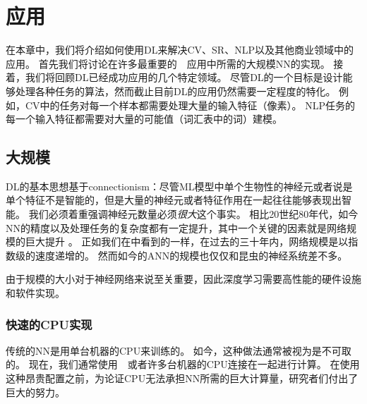 \chapter{应用}
\label{chap:applications}

在本章中，我们将介绍如何使用\gls{DL}来解决\gls{CV}、\gls{SR}、\gls{NLP}以及其他商业领域中的应用。
首先我们将讨论在许多最重要的~~应用中所需的大规模\gls{NN}的实现。
接着，我们将回顾\gls{DL}已经成功应用的几个特定领域。
尽管\gls{DL}的一个目标是设计能够处理各种任务的算法，然而截止目前\gls{DL}的应用仍然需要一定程度的特化。
例如，\gls{CV}中的任务对每一个样本都需要处理大量的输入特征（像素）。
\gls{NLP}任务的每一个输入特征都需要对大量的可能值（词汇表中的词）建模。

\section{大规模}
\label{sec:large_scale_deep_learning}

\gls{DL}的基本思想基于\gls{connectionism}：尽管\gls{ML}模型中单个生物性的神经元或者说是单个特征不是智能的，但是大量的神经元或者特征作用在一起往往能够表现出智能。
我们必须着重强调神经元数量必须\emph{很大}这个事实。
相比20世纪80年代，如今\gls{NN}的精度以及处理任务的复杂度都有一定提升，其中一个关键的因素就是网络规模的巨大提升
。
正如我们在中看到的一样，在过去的三十年内，网络规模是以指数级的速度递增的。
然而如今的\gls{ANN}的规模也仅仅和昆虫的神经系统差不多。

由于规模的大小对于神经网络来说至关重要，因此深度学习需要高性能的硬件设施和软件实现。

\subsection{快速的CPU实现}
\label{sec:fast_cpu_implementations}

传统的\gls{NN}是用单台机器的CPU来训练的。
如今，这种做法通常被视为是不可取的。
现在，我们通常使用~~或者许多台机器的CPU连接在一起进行计算。
在使用这种昂贵配置之前，为论证CPU无法承担\gls{NN}所需的巨大计算量，研究者们付出了巨大的努力。


